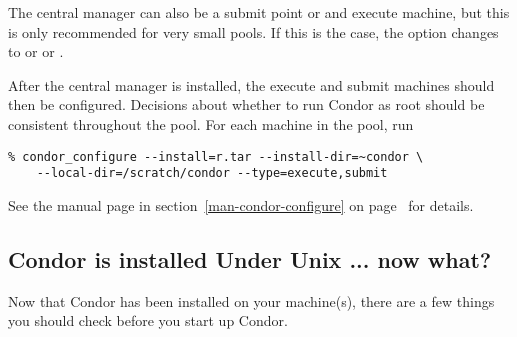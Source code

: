 The central manager can also be a submit point or and execute machine, but
this is only recommended for very small pools.
If this is the case, the  option changes to
 or   or 
.

After the central manager is installed, the execute and submit machines
should then be configured.  Decisions about whether to run Condor as root
should be consistent throughout the pool. For each machine in the pool,
run

\begin{verbatim}
% condor_configure --install=r.tar --install-dir=~condor \
	--local-dir=/scratch/condor --type=execute,submit
\end{verbatim}

See the  manual page in
section~\ref{man-condor-configure} on
page~\pageref{man-condor-configure} for details.


\subsection{\label{installed-now-what}
Condor is installed Under Unix ... now what?}

Now that Condor has been installed on your machine(s), there are a few
things you should check before you start up Condor.

